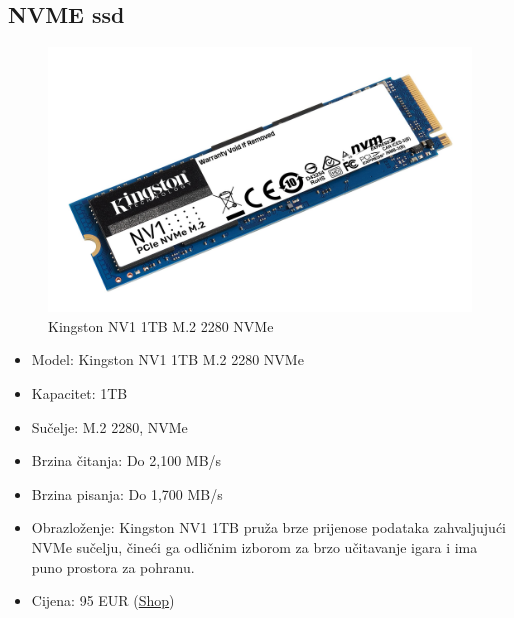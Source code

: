 \documentclass{article}
\begin{document}
\subsection{NVME ssd}
\begin{figure}[H]
    \centering
    \includegraphics[width = \textwidth]{Slike/NVMe.jpg}
    \caption{Kingston NV1 1TB M.2 2280 NVMe}
    \label{fig:NVMe}
\end{figure}
\begin{itemize}
    \item Model: Kingston NV1 1TB M.2 2280 NVMe
    \item Kapacitet: 1TB
    \item Sučelje: M.2 2280, NVMe
    \item Brzina čitanja: Do 2,100 MB/s
    \item Brzina pisanja: Do 1,700 MB/s
    \item Obrazloženje: Kingston NV1 1TB pruža brze prijenose podataka zahvaljujući NVMe sučelju, čineći ga odličnim izborom za brzo učitavanje igara i ima puno prostora za pohranu.
    \item Cijena: 95 EUR (\href{https://vacom.hr/proizvod/ssd-kingston-nv1-1tb-m-2-2280-nvme/}{Shop})
\end{itemize}
\end{document}
